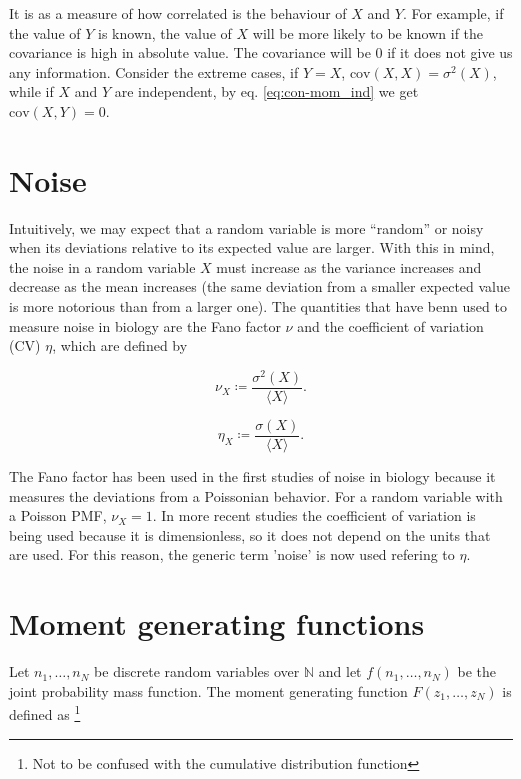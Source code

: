 It is as a measure of how correlated is the behaviour of $X$ and $Y$. For example, if the value of $Y$ is known, the value of $X$ will be more likely to be known if the covariance is high in absolute value. The covariance will be $0$ if it does not give us any information. Consider the extreme cases, if $Y=X$, $\text{cov}(X,X) = \sigma^2(X)$, while if $X$ and $Y$ are independent, by eq. \eqref{eq:con-mom_ind} we get $\text{cov}(X,Y) = 0$.

\section{Noise}
\label{sec:con-noise}
Intuitively, we may expect that a random variable is more ``random'' or noisy when its deviations relative to its expected value are larger. With this in mind, the noise in a random variable $X$ must increase as the variance increases and decrease as the mean increases (the same deviation from a smaller expected value is more notorious than from a larger one). The quantities that have benn used to measure noise in biology are the Fano factor $\nu$ and the coefficient of variation (CV) $\eta$, which are defined by

\begin{equation}
  \label{eq:con-fano_def}
  \nu_X \coloneqq \frac{\sigma^2(X)}{\langle X \rangle}.
\end{equation}

\begin{equation}
  \label{eq:con-cv_def}
  \eta_X \coloneqq \frac{\sigma(X)}{\langle X \rangle}.
\end{equation}

The Fano factor has been used in the first studies of noise in biology because it measures the deviations from a Poissonian behavior. For a random variable with a Poisson PMF, $\nu_X=1$. In more recent studies the coefficient of variation is being used because it is dimensionless, so it does not depend on the units that are used. For this reason, the generic term 'noise' is now used refering to $\eta$.

\section{Moment generating functions}

Let $n_1,\dotsc,n_N$ be discrete random variables over $\mathbb{N}$ and let $f(n_1,\dotsc,n_N)$ be the joint probability mass function. The moment generating function $F(z_1,\dotsc,z_N)$ is defined as \footnote{Not to be confused with the cumulative distribution function}

